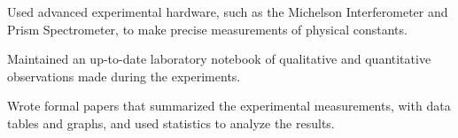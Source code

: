 \documentclass[letterpaper]{deedy-resume} %
\begin{document}
\begin{minipage}[t]{0.66\textwidth}
\sectionspace

\location{    }
\begin{tightitemize}
\item Used advanced experimental hardware, such as the Michelson Interferometer and Prism Spectrometer, to make precise measurements of physical constants. 
\item Maintained an up-to-date laboratory notebook of qualitative and quantitative observations made during the experiments.
\item Wrote formal papers that summarized the experimental measurements, with data tables and graphs, and used statistics to analyze the results.
\end{tightitemize}



\end{minipage} %








\end{document}
